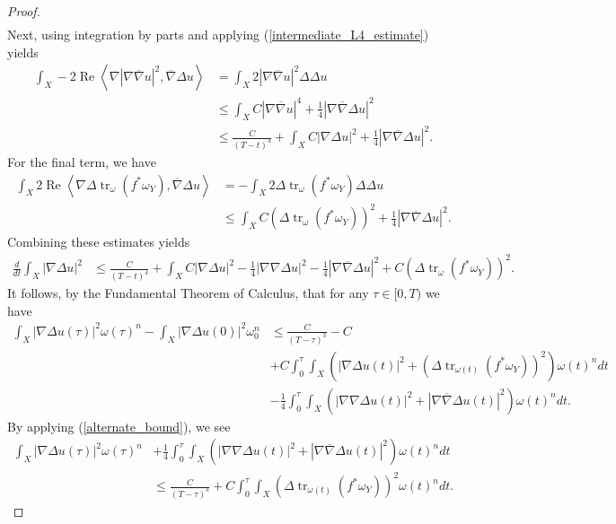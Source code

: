 \documentclass[12pt]{article}
\numberwithin{equation}{section}
\DeclareMathOperator{\tr}{tr}
\DeclareMathOperator{\Real}{Re}
\newcommand{\oo}[1]{\overline{#1}}
\newcommand{\ip}[1]{\left\langle#1\right\rangle}
\begin{document}
\begin{proof}
\begin{align*}
\end{align*}
Next, using integration by parts and applying (\ref{intermediate_L4_estimate}) yields
\begin{align*}
    \int_X -2 \Real \ip{\nabla |\nabla \oo{\nabla} u|^2, \oo{\nabla} \Delta u} &= \int_X 2 |\nabla \oo{\nabla} u|^2 \Delta \Delta u\\
    &\leq \int_X C|\nabla \oo{\nabla} u|^4 + \frac{1}{4} |\nabla \oo{\nabla} \Delta u|^2\\
    &\leq \frac{C}{(T-t)^4} + \int_X C |\nabla \Delta u|^2 + \frac{1}{4} |\nabla \oo{\nabla} \Delta u|^2.
\end{align*}
For the final term, we have
\begin{align*}
    \int_X 2\Real \ip{\nabla \Delta \tr_\omega(f^*\omega_Y), \oo{\nabla} \Delta u} &=- \int_X 2 \Delta \tr_\omega(f^*\omega_Y) \Delta \Delta u\\
    &\leq \int_X C(\Delta \tr_\omega(f^*\omega_Y))^2 + \frac{1}{4} |\nabla \oo{\nabla} \Delta u|^2.
\end{align*}
Combining these estimates yields
\begin{align*}
    \frac{d}{dt} \int_X |\nabla \Delta u|^2 &\leq \frac{C}{(T-t)^4} + \int_X C|\nabla \Delta u|^2 - \frac{1}{4} |\nabla \nabla \Delta u|^2 - \frac{1}{4} |\nabla \oo{\nabla} \Delta u|^2 + C(\Delta \tr_\omega(f^*\omega_Y))^2.
\end{align*}
It follows, by the Fundamental Theorem of Calculus, that for any $\tau \in [0,T)$ we have
\begin{align*}
    \int_X |\nabla \Delta u(\tau)|^2 \omega(\tau)^n - \int_X |\nabla \Delta u(0)|^2 \omega_0^n &\leq \frac{C}{(T-\tau)^3} - C\\
    &+ C\int_0^\tau \int_X (|\nabla \Delta u(t)|^2 + (\Delta \tr_{\omega(t)}(f^*\omega_Y))^2) \omega(t)^n dt\\
    &-\frac{1}{4} \int_0^\tau \int_X (|\nabla \nabla \Delta u(t)|^2 + |\nabla \oo{\nabla} \Delta u(t)|^2) \omega(t)^n dt.
\end{align*}
By applying (\ref{alternate_bound}), we see
\begin{align*}
    \int_X |\nabla \Delta u(\tau)|^2\omega(\tau)^n &+ \frac{1}{4} \int_0^\tau \int_X (|\nabla \nabla \Delta u(t)|^2 + |\nabla \oo{\nabla} \Delta u(t)|^2) \omega(t)^n dt\\ 
    &\leq \frac{C}{(T-\tau)^3} + C\int_0^\tau \int_X (\Delta \tr_{\omega(t)}(f^*\omega_Y))^2 \omega(t)^n dt.
\end{align*}
\end{proof}
\end{document}
